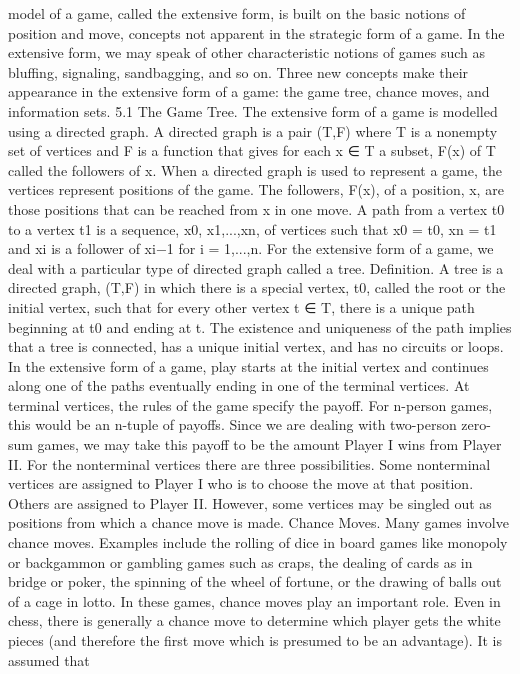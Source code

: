 model of a game, called the extensive form, is built on the basic notions of position and
move, concepts not apparent in the strategic form of a game. In the extensive form, we
may speak of other characteristic notions of games such as bluffing, signaling, sandbagging,
and so on. Three new concepts make their appearance in the extensive form of a game:
the game tree, chance moves, and information sets.
5.1 The Game Tree. The extensive form of a game is modelled using a directed
graph. A directed graph is a pair (T,F) where T is a nonempty set of vertices and F is
a function that gives for each x ∈ T a subset, F(x) of T called the followers of x. When
a directed graph is used to represent a game, the vertices represent positions of the game.
The followers, F(x), of a position, x, are those positions that can be reached from x in one
move.
A path from a vertex t0 to a vertex t1 is a sequence, x0, x1,...,xn, of vertices
such that x0 = t0, xn = t1 and xi is a follower of xi−1 for i = 1,...,n. For the extensive
form of a game, we deal with a particular type of directed graph called a tree.
Definition. A tree is a directed graph, (T,F) in which there is a special vertex, t0, called
the root or the initial vertex, such that for every other vertex t ∈ T, there is a unique path
beginning at t0 and ending at t.
The existence and uniqueness of the path implies that a tree is connected, has a unique
initial vertex, and has no circuits or loops.
In the extensive form of a game, play starts at the initial vertex and continues along
one of the paths eventually ending in one of the terminal vertices. At terminal vertices,
the rules of the game specify the payoff. For n-person games, this would be an n-tuple of
payoffs. Since we are dealing with two-person zero-sum games, we may take this payoff to
be the amount Player I wins from Player II. For the nonterminal vertices there are three
possibilities. Some nonterminal vertices are assigned to Player I who is to choose the move
at that position. Others are assigned to Player II. However, some vertices may be singled
out as positions from which a chance move is made.
Chance Moves. Many games involve chance moves. Examples include the rolling of
dice in board games like monopoly or backgammon or gambling games such as craps, the
dealing of cards as in bridge or poker, the spinning of the wheel of fortune, or the drawing
of balls out of a cage in lotto. In these games, chance moves play an important role. Even
in chess, there is generally a chance move to determine which player gets the white pieces
(and therefore the first move which is presumed to be an advantage). It is assumed that
